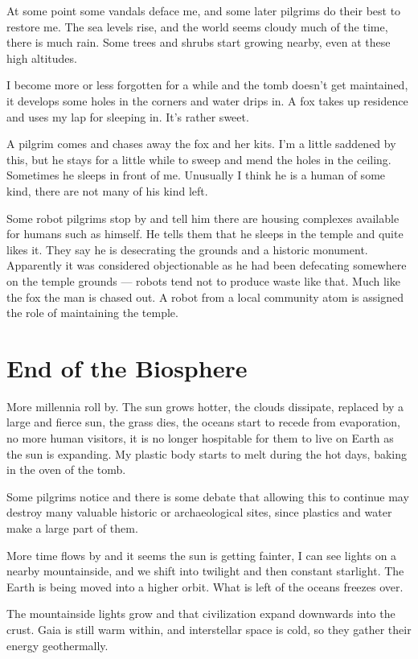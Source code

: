 At some point some vandals deface me, and some later pilgrims do their best to
restore me. The sea levels rise, and the world seems cloudy much of the time,
there is much rain.  Some trees and shrubs start growing nearby, even at these
high altitudes. 

I become more or less forgotten for a while and the tomb doesn't get maintained,
it develops some holes in the corners and water drips in. A fox takes up
residence and uses my lap for sleeping in. It's rather sweet. 

A pilgrim comes and chases away the fox and her kits. I'm a little saddened by
this, but he stays for a little while to sweep and mend the holes in the
ceiling. Sometimes he sleeps in front of me. Unusually I think he is a human of
some kind, there are not many of his kind left. 

Some robot pilgrims stop by and tell him there are housing complexes available
for humans such as himself. He tells them that he sleeps in the temple and quite
likes it. They say he is desecrating the grounds and a historic monument.
Apparently it was considered objectionable as he had been defecating somewhere
on the temple grounds --- robots tend not to produce waste like that. Much
like the fox the man is chased out. A robot from a local community
atom is assigned the role of maintaining the temple.

\section{End of the Biosphere}
More millennia roll by.  The sun grows hotter, the clouds dissipate, replaced by
a large and fierce sun, the grass dies, the oceans start to recede from 
evaporation, no more human visitors, it is no longer hospitable for them to live
on Earth as the sun is expanding. My plastic body starts to melt during the hot 
days, baking in the oven of the tomb.

Some pilgrims notice and there is some debate that allowing this to continue
may destroy many valuable historic or archaeological sites, since plastics and
water make a large part of them. 

More time flows by and it seems the sun is getting fainter, I can see lights on
a nearby mountainside, and we shift into twilight and then constant starlight.
The Earth is being moved into a higher orbit. What is left of the oceans freezes
over. 

The mountainside lights grow and that civilization expand downwards into the 
crust. Gaia is still warm within, and interstellar space is cold, so they gather 
their energy geothermally. 

